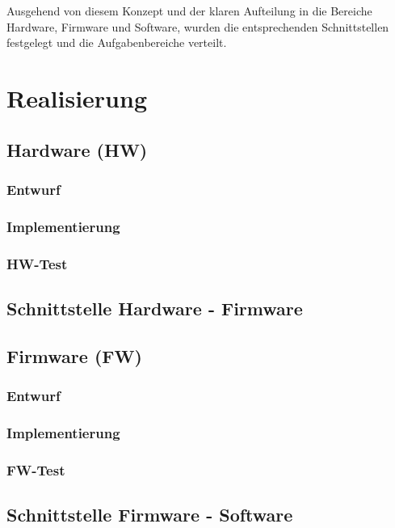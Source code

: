 \documentclass[a4paper, portrait, 12pt]{scrartcl} %
\begin{document}
Ausgehend von diesem Konzept und der klaren Aufteilung in die Bereiche Hardware, Firmware und Software, wurden die entsprechenden Schnittstellen festgelegt und die Aufgabenbereiche verteilt.

\pagebreak

\section{Realisierung}

\subsection{Hardware (HW)}
\subsubsection{Entwurf}
\subsubsection{Implementierung}
\subsubsection{HW-Test}

\subsection{Schnittstelle Hardware - Firmware}


\subsection{Firmware (FW)}
\subsubsection{Entwurf}
\subsubsection{Implementierung}
\subsubsection{FW-Test}

\subsection{Schnittstelle Firmware - Software}
\end{document}
